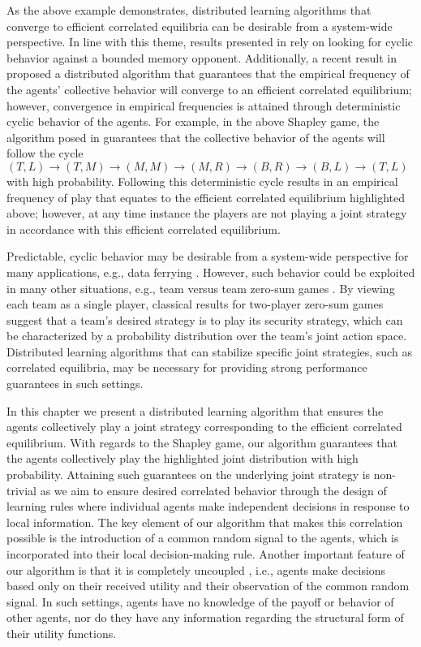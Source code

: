 As the above example demonstrates, distributed learning algorithms that converge to efficient correlated equilibria can be desirable from a system-wide perspective.  In line with this theme, results presented in \cite{Lim2014} rely on looking for cyclic behavior against a bounded memory opponent. Additionally, a recent result in \cite{Marden2013c} proposed a distributed algorithm that guarantees that the empirical frequency of the agents' collective behavior will converge to an efficient correlated equilibrium; however, convergence in empirical frequencies is attained through deterministic cyclic behavior of the agents.   For example, in the above Shapley game, the algorithm posed in \cite{Marden2013c} guarantees that the collective behavior of the agents will follow the cycle 
%
$ (T,L)  \rightarrow (T,M) \rightarrow (M,M) \rightarrow (M,R) \rightarrow (B,R) \rightarrow (B,L) \rightarrow (T,L)$
%
with high probability.  Following this deterministic cycle results in an empirical frequency of play that equates to the efficient correlated equilibrium highlighted above; however, at any time instance the players are not playing a joint strategy in accordance with this efficient correlated equilibrium.    


Predictable, cyclic behavior may be desirable from a system-wide perspective for many applications, e.g., data ferrying \cite{Carfang2013}. However, such behavior could be exploited in many other situations, e.g., team versus team zero-sum games \cite{Ho1974, Stengel1997}.  By viewing each team as a single player, classical results for two-player zero-sum games suggest that a team's desired strategy is to play its security strategy, which can be characterized by a probability distribution over the team's joint action space. %
Distributed learning algorithms that can stabilize specific joint strategies, such as correlated equilibria, may be necessary for providing strong performance guarantees in such settings.  

In this chapter we present a distributed learning algorithm that ensures the agents collectively play a joint strategy corresponding to the efficient correlated equilibrium.  With regards to the Shapley game, our algorithm guarantees that the agents collectively play the highlighted joint distribution with high probability.  Attaining such guarantees on the underlying joint strategy is non-trivial as we aim to ensure desired correlated behavior through the design of learning rules where individual agents make independent decisions in response to local information.  The key element of our algorithm that makes this correlation possible is the introduction of a common random signal to the agents, which is incorporated into their local decision-making rule.  Another important feature of our algorithm is that it is completely uncoupled \cite{Foster2006}, i.e., agents make decisions based only on their received utility and their observation of the common random signal.  In such settings, agents have no knowledge of the payoff or behavior of other agents, nor do they have any information regarding the structural form of their utility functions.   

